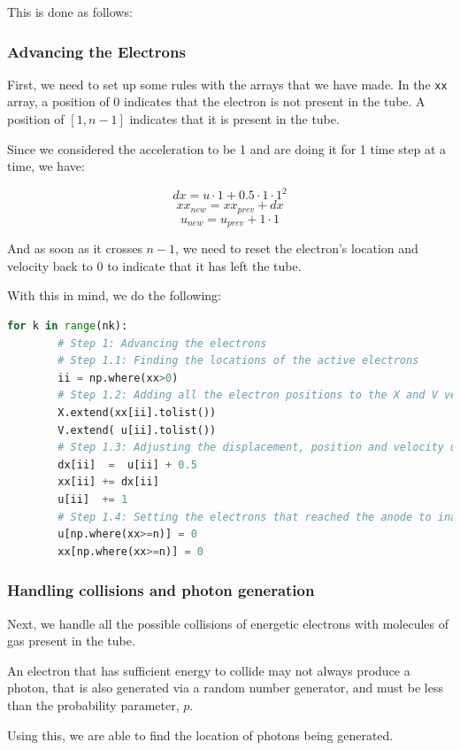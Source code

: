 \documentclass[12pt]{article}
\begin{document}
This is done as follows:

\subsubsection{Advancing the Electrons}
First, we need to set up some rules with the arrays that we have made.
In the \texttt{xx} array, a position of 0 indicates that the electron is not present in the tube. A position of $[1,n-1]$ indicates that it is present in the tube.

Since we considered the acceleration to be 1 and are doing it for 1 time step at a time, we have:

$$dx = u\cdot1 + 0.5\cdot 1 \cdot 1^2$$
$$xx_{new} = xx_{prev} + dx$$
$$u_{new} = u_{prev} + 1\cdot 1$$

And as soon as it crosses $n-1$, we need to reset the electron's location and velocity back to 0 to indicate that it has left the tube.

With this in mind, we do the following:

\begin{lstlisting}[language=Python]
    for k in range(nk):
        # Step 1: Advancing the electrons
        # Step 1.1: Finding the locations of the active electrons
        ii = np.where(xx>0)
        # Step 1.2: Adding all the electron positions to the X and V vectors
        X.extend(xx[ii].tolist())
        V.extend( u[ii].tolist())
        # Step 1.3: Adjusting the displacement, position and velocity using the equations of motion
        dx[ii]  =  u[ii] + 0.5
        xx[ii] += dx[ii]
        u[ii]  += 1
        # Step 1.4: Setting the electrons that reached the anode to inactive
        u[np.where(xx>=n)] = 0
        xx[np.where(xx>=n)] = 0
\end{lstlisting}

\subsubsection{Handling collisions and photon generation}

Next, we handle all the possible collisions of energetic electrons with molecules of gas present in the tube.

An electron that has sufficient energy to collide may not always produce a photon, that is also generated via a random number generator, and must be less than the probability parameter, $p$.

Using this, we are able to find the location of photons being generated.
\end{document}
